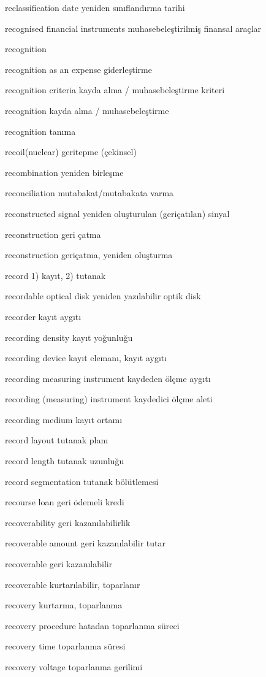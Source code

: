 \documentclass[12pt,fleqn]{article}\usepackage{../../common}
\begin{document}
reclassification date yeniden sınıflandırma tarihi

recognised financial instruments muhasebeleştirilmiş finansal araçlar

recognition

recognition as an expense giderleştirme

recognition criteria kayda alma / muhasebeleştirme kriteri

recognition kayda alma / muhasebeleştirme

recognition tanıma

recoil(nuclear) geritepme (çekinsel)

recombination yeniden birleşme

reconciliation mutabakat/mutabakata varma

reconstructed signal yeniden oluşturulan (geriçatılan) sinyal

reconstruction geri çatma

reconstruction geriçatma, yeniden oluşturma

record 1) kayıt, 2) tutanak

recordable optical disk yeniden yazılabilir optik disk

recorder kayıt aygıtı

recording density kayıt yoğunluğu

recording device kayıt elemanı, kayıt aygıtı

recording measuring instrument kaydeden ölçme aygıtı

recording (measuring) instrument kaydedici ölçme aleti

recording medium kayıt ortamı

record layout tutanak planı

record length tutanak uzunluğu

record segmentation tutanak bölütlemesi

recourse loan geri ödemeli kredi

recoverability geri kazanılabilirlik

recoverable amount geri kazanılabilir tutar

recoverable geri kazanılabilir

recoverable kurtarılabilir, toparlanır

recovery kurtarma, toparlanma

recovery procedure hatadan toparlanma süreci

recovery time toparlanma süresi

recovery voltage toparlanma gerilimi
\end{document}
